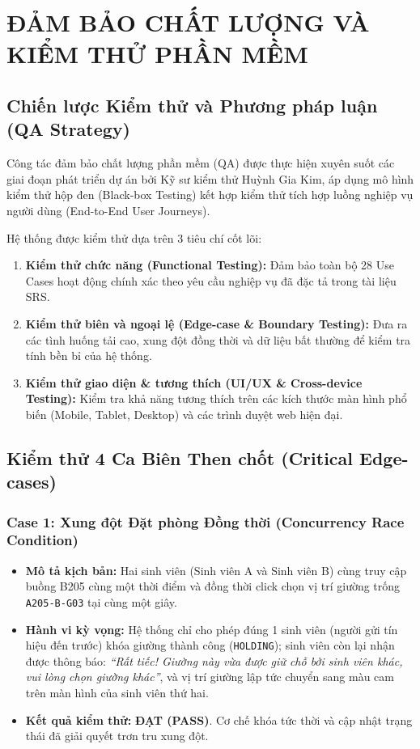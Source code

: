 \chapter{ĐẢM BẢO CHẤT LƯỢNG VÀ KIỂM THỬ PHẦN MỀM}
\label{ch:testing}

\section{Chiến lược Kiểm thử và Phương pháp luận (QA Strategy)}
Công tác đảm bảo chất lượng phần mềm (QA) được thực hiện xuyên suốt các giai đoạn phát triển dự án bởi Kỹ sư kiểm thử Huỳnh Gia Kim, áp dụng mô hình kiểm thử hộp đen (Black-box Testing) kết hợp kiểm thử tích hợp luồng nghiệp vụ người dùng (End-to-End User Journeys).

Hệ thống được kiểm thử dựa trên 3 tiêu chí cốt lõi:
\begin{enumerate}
    \item \textbf{Kiểm thử chức năng (Functional Testing):} Đảm bảo toàn bộ 28 Use Cases hoạt động chính xác theo yêu cầu nghiệp vụ đã đặc tả trong tài liệu SRS.
    \item \textbf{Kiểm thử biên và ngoại lệ (Edge-case \& Boundary Testing):} Đưa ra các tình huống tải cao, xung đột đồng thời và dữ liệu bất thường để kiểm tra tính bền bỉ của hệ thống.
    \item \textbf{Kiểm thử giao diện \& tương thích (UI/UX \& Cross-device Testing):} Kiểm tra khả năng tương thích trên các kích thước màn hình phổ biến (Mobile, Tablet, Desktop) và các trình duyệt web hiện đại.
\end{enumerate}

\section{Kiểm thử 4 Ca Biên Then chốt (Critical Edge-cases)}

\subsection{Case 1: Xung đột Đặt phòng Đồng thời (Concurrency Race Condition)}
\begin{itemize}
    \item \textbf{Mô tả kịch bản:} Hai sinh viên (Sinh viên A và Sinh viên B) cùng truy cập buồng B205 cùng một thời điểm và đồng thời click chọn vị trí giường trống \texttt{A205-B-G03} tại cùng một giây.
    \item \textbf{Hành vi kỳ vọng:} Hệ thống chỉ cho phép đúng 1 sinh viên (người gửi tín hiệu đến trước) khóa giường thành công (\texttt{HOLDING}); sinh viên còn lại nhận được thông báo: \textit{``Rất tiếc! Giường này vừa được giữ chỗ bởi sinh viên khác, vui lòng chọn giường khác''}, và vị trí giường lập tức chuyển sang màu cam trên màn hình của sinh viên thứ hai.
    \item \textbf{Kết quả kiểm thử:} \textbf{\color{green!70!black}ĐẠT (PASS)}. Cơ chế khóa tức thời và cập nhật trạng thái đã giải quyết trơn tru xung đột.
\end{itemize}

